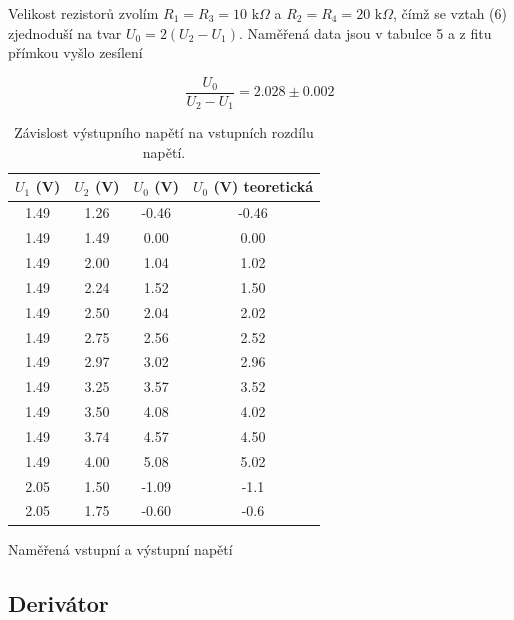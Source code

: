 \documentclass[a4paper,11pt]{article}
\begin{document}
Velikost rezistorů zvolím $ R_1 = R_3 = 10 \text{ k} \Omega $ a $ R_2 = R_4 = 20 \text{ k}\Omega $, čímž se vztah (6) zjednoduší na tvar $ U_0 = 2(U_2 - U_1) $. Naměřená data jsou v tabulce 5 a z fitu přímkou vyšlo zesílení

\begin{equation}
\frac{U_0}{U_2 - U_1} =  2.028 \pm 0.002 
\end{equation}

\begin{table}[h]
    \begin{minipage}[b]{.45\linewidth}
        \centering
        \begin{tabular}{ | c c c c | }
            \hline
            $ U_1 $ (V) & $ U_2 $ (V) & $ U_0 $ (V) & $ U_0 $ (V) teoretická\\
            \hline
            1.49 & 1.26 & -0.46 & -0.46 \\
            1.49 & 1.49 & 0.00  & 0.00   \\
            1.49 & 2.00 & 1.04  & 1.02 \\
            1.49 & 2.24 & 1.52  & 1.50  \\
            1.49 & 2.50 & 2.04  & 2.02 \\
            1.49 & 2.75 & 2.56  & 2.52 \\
            1.49 & 2.97 & 3.02  & 2.96 \\
            1.49 & 3.25 & 3.57  & 3.52 \\
            1.49 & 3.50 & 4.08  & 4.02 \\
            1.49 & 3.74 & 4.57  & 4.50  \\
            1.49 & 4.00 & 5.08  & 5.02 \\
            2.05 & 1.50 & -1.09 & -1.1 \\
            2.05 & 1.75 & -0.60 & -0.6 \\
            \hline
        \end{tabular}
        \caption{Naměřená vstupní a výstupní napětí}
    \end{minipage} 
    \hfill
    \begin{minipage}[b]{.45\linewidth}
        \centering
        \resizebox{\textwidth}{!}{  }
        \captionsetup{type=graph}
        \caption{Závislost výstupního napětí na vstupních rozdílu napětí.}
    \end{minipage} 
\end{table}

\newpage

\subsection{Derivátor}
\end{document}
